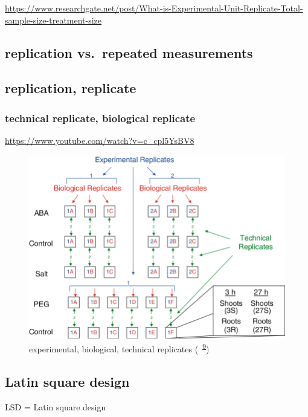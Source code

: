\documentclass[
]{book}
\theoremstyle{definition}
\theoremstyle{definition}
\theoremstyle{definition}
\theoremstyle{definition}
\theoremstyle{remark}
\begin{document}
\url{https://www.researchgate.net/post/What-is-Experimental-Unit-Replicate-Total-sample-size-treatment-size}

\hypertarget{replication-vs.-repeated-measurements}{%
\subsection{replication vs.~repeated measurements}\label{replication-vs.-repeated-measurements}}

\hypertarget{replication-replicate}{%
\subsection{replication, replicate}\label{replication-replicate}}

\hypertarget{technical-replicate-biological-replicate}{%
\subsubsection{technical replicate, biological replicate}\label{technical-replicate-biological-replicate}}

\url{https://www.youtube.com/watch?v=c_cpl5YsBV8}



\begin{figure}
\includegraphics[width=0.65\linewidth]{img/buchanan2005-replicates} \caption{experimental, biological, technical replicates (~\textsuperscript{\protect\hyperlink{ref-buchanan2005}{9}})}\label{fig:unnamed-chunk-1}
\end{figure}

\hypertarget{latin-square-design}{%
\subsection{Latin square design}\label{latin-square-design}}

LSD = Latin square design
\end{document}
